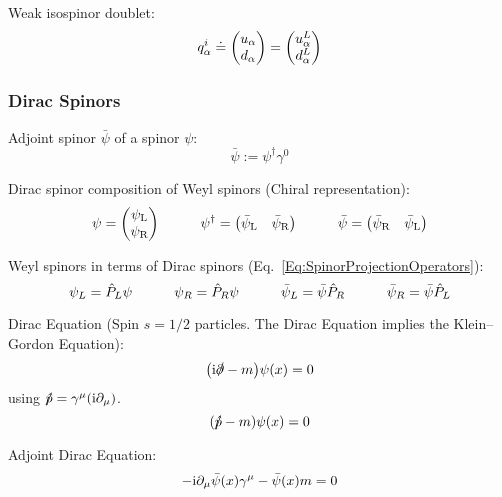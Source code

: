 			\noindent
			Weak isospinor doublet:
			\begin{equation}
				q_{\alpha}^i \doteq \mqty(u_{\alpha} \\ d_{\alpha}) = \mqty(u^L_{\alpha} \\ d^L_{\alpha})
			\end{equation}




		\subsubsection{Dirac Spinors}
			Adjoint spinor $\bar{\psi}$ of a spinor $\psi$:
			\begin{equation}
				\bar{\psi} := \psi^{\dagger} \gamma^0
			\end{equation}

			\noindent
			Dirac spinor composition of Weyl spinors (Chiral representation):
			\begin{equation}
				\psi = \mqty(\psi_\text{L} \\ \psi_\text{R})
				\hsp
				\psi^\dagger = \mqty(\bar{\psi}_\text{L} & \bar{\psi}_\text{R})
				\hsp
				\bar{\psi} = \mqty(\bar{\psi}_\text{R} & \bar{\psi}_\text{L})
			\end{equation}

			\noindent
			Weyl spinors in terms of Dirac spinors (Eq.~\ref{Eq:SpinorProjectionOperators}):
			\begin{equation}
				\psi_L = \hat{P}_L \psi \hspace{30pt} \psi_R = \hat{P}_R \psi
				\hspace{30pt}
				\bar{\psi}_L = \bar{\psi} \hat{P}_R \hspace{30pt} \bar{\psi}_R = \bar{\psi} \hat{P}_L
			\end{equation}

			\noindent
			Dirac Equation (Spin $s=1/2$ particles. The Dirac Equation implies the Klein--Gordon Equation):
			\begin{equation}
				\qty(\mathrm{i}\slashed{\partial} - m ) \psi\qty(x) = 0
			\end{equation}
			using $\slashed{\hat{p}} = \gamma^\mu(\mathrm{i}\partial_\mu)$.
			\begin{equation}
				\qty(\slashed{\hat{p}} - m) \psi\qty(x) = 0
			\end{equation}

			\noindent
			Adjoint Dirac Equation:
			\begin{equation}
				-\mathrm{i} \partial_\mu \bar{\psi}(x)\gamma^\mu-\bar\psi(x)m = 0
			\end{equation}

